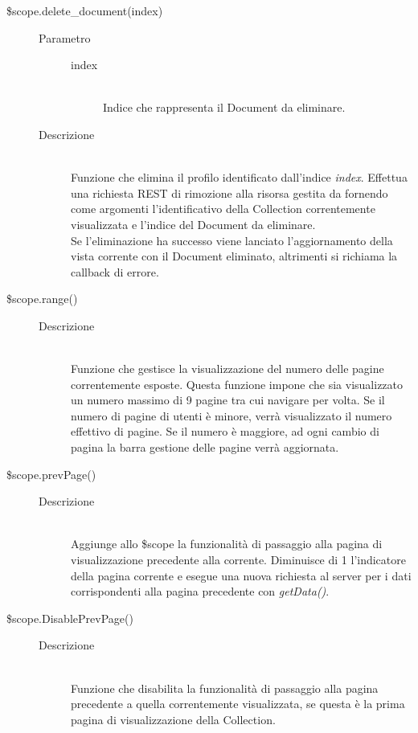 \begin{description}
\begin{description}
  \item[\$scope.delete\_document(index)] \hfill
  \begin{description}
  	\item[Parametro] \hfill
  		\begin{description}
  			\item[index] \hfill \\
  			Indice che rappresenta il Document da eliminare.
       \end{description}
  	\item[Descrizione] \hfill \\
      Funzione che elimina il profilo identificato dall'indice \textit{index}. Effettua una richiesta REST di rimozione alla risorsa gestita da  fornendo come argomenti l'identificativo della Collection correntemente visualizzata e l'indice del Document da eliminare. \\
  Se l'eliminazione ha successo viene lanciato l'aggiornamento della vista corrente con il Document eliminato, altrimenti si richiama la callback di errore.
    \end{description}
    
    \item[\$scope.range()] \hfill
  \begin{description}
  	\item[Descrizione] \hfill \\
  	Funzione che gestisce la visualizzazione del numero delle pagine correntemente esposte. Questa funzione impone che sia visualizzato un numero massimo di 9 pagine tra cui navigare per volta. Se il numero di pagine di utenti è minore, verrà visualizzato il numero effettivo di pagine. Se il numero è maggiore, ad ogni cambio di pagina la barra gestione delle pagine verrà aggiornata.
  \end{description}

	\item[\$scope.prevPage()] \hfill
    	\begin{description}
  		\item[Descrizione] \hfill \\
  Aggiunge allo \$scope la funzionalità di passaggio alla pagina di visualizzazione precedente alla corrente.
  Diminuisce di 1 l'indicatore della pagina corrente e esegue una nuova richiesta al server per i dati corrispondenti alla pagina precedente con \textit{getData()}.
    \end{description}
    
  \item[\$scope.DisablePrevPage()] \hfill
  \begin{description}
  	\item[Descrizione] \hfill \\
  	Funzione che disabilita la funzionalità di passaggio alla pagina precedente a quella correntemente visualizzata, se questa è la prima pagina di visualizzazione della Collection.
  \end{description}


\end{description}
\end{description}
